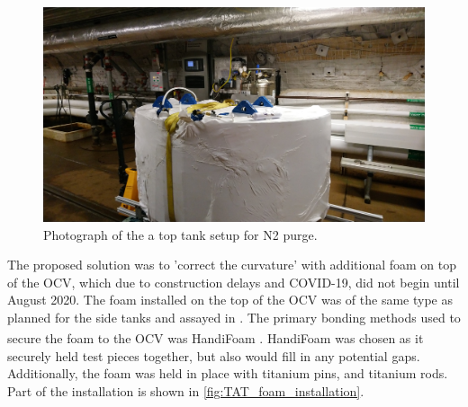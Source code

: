 \begin{figure}[!tbph]
\includegraphics[width=\textwidth]{Figures/Construction/tat_purging.JPG}
\centering
\caption{Photograph of the a top tank setup for N2 purge.}
\label{fig:TAT_purging}
\end{figure}

\par
The proposed solution was to 'correct the curvature' with additional foam on top of the OCV, which due to construction delays and COVID-19, did not begin until August 2020.
The foam installed on the top of the OCV was of the same type as planned for the side tanks and assayed in \cite{LZ_assay_ref}.
The primary bonding methods used to secure the foam to the OCV was HandiFoam\textsuperscript{\textregistered} \cite{handifoam_ref}.
HandiFoam\textsuperscript{\textregistered} was chosen as it securely held test pieces together, but also would fill in any potential gaps.
Additionally, the foam was held in place with titanium pins, and titanium rods.
Part of the installation is shown in \autoref{fig:TAT_foam_installation}.

